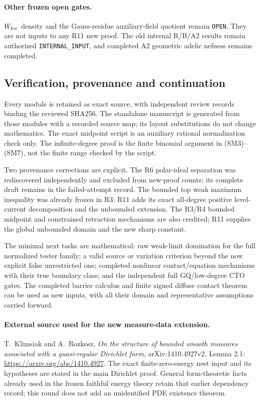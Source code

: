 \documentclass[11pt,a4paper]{article}
\numberwithin{equation}{section}
\theoremstyle{definition}
\theoremstyle{remark}
\begin{document}
\paragraph{Other frozen open gates.}
$W_{\rm loc}$ density and the Gauss-residue
auxiliary-field quotient remain
\texttt{OPEN}.  They are not inputs to
any R11 new proof.
The old internal R/B/A2 results remain
authorized \texttt{INTERNAL\_INPUT},
and completed A2 geometric adelic
nefness remains completed.

\subsection{Verification, provenance and continuation}

Every module is retained as exact source,
with independent review records binding
the reviewed SHA256.
The standalone manuscript is generated
from those modules with a recorded source
map; its layout substitutions do not
change mathematics.
The exact midpoint script is an auxiliary
rational normalization check only.
The infinite-degree proof is the finite
binomial argument in (SM3)--(SM7), not
the finite range checked by the script.

Two provenance corrections are explicit.
The R6 polar-ideal separation was
rediscovered independently and excluded
from new-proof counts; its complete
draft remains in the failed-attempt record.
The bounded top weak maximum inequality
was already frozen in R3; R11 adds its
exact all-degree positive level-current
decomposition and the unbounded extension.
The R3/R4 bounded midpoint and constrained
retraction mechanisms are also credited;
R11 supplies the global unbounded domain
and the new sharp constant.

The minimal next tasks are mathematical:
raw weak-limit domination for the full
normalized tester family; a valid source
or variation criterion beyond the now
explicit false unrestricted one; completed
nonlinear contact/equation mechanisms with
their true boundary class; and the
independent full GQ/low-degree CTO gates.
The completed barrier calculus and
finite signed diffuse contact theorem
can be used as new inputs, with all their
domain and representative assumptions
carried forward.

\paragraph{External source used for the new measure-data extension.}
T.~Klimsiak and A.~Rozkosz,
\emph{On the structure of bounded smooth measures
associated with a quasi-regular Dirichlet form},
arXiv:1410.4927v2, Lemma 2.1:
\url{https://arxiv.org/abs/1410.4927}.
The exact finite-zero-energy nest input and
its hypotheses are stated in the main
Dirichlet proof.  General form-theoretic
facts already used in the frozen faithful
energy theory retain that earlier dependency
record; this round does not add an
unidentified PDE existence theorem.

\end{document}
